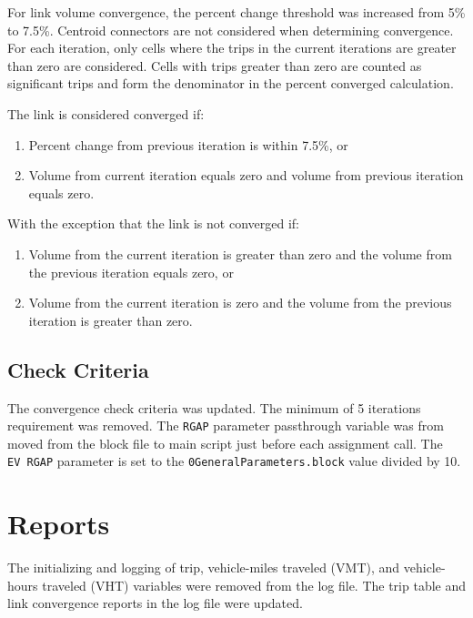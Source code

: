 \documentclass[
  letterpaper,
  DIV=11,
  numbers=noendperiod,
  titlepage=false]{scrreprt}
\providecommand{\tightlist}{%
  \setlength{\itemsep}{0pt}\setlength{\parskip}{0pt}}\usepackage{longtable,booktabs,array}
\begin{document}
For link volume convergence, the percent change threshold was increased
from 5\% to 7.5\%. Centroid connectors are not considered when
determining convergence. For each iteration, only cells where the trips
in the current iterations are greater than zero are considered. Cells
with trips greater than zero are counted as significant trips and form
the denominator in the percent converged calculation.

The link is considered converged if:

\begin{enumerate}
\def\labelenumi{\arabic{enumi}.}
\tightlist
\item
  Percent change from previous iteration is within 7.5\%, or
\item
  Volume from current iteration equals zero and volume from previous
  iteration equals zero.
\end{enumerate}

With the exception that the link is not converged if:

\begin{enumerate}
\def\labelenumi{\arabic{enumi}.}
\tightlist
\item
  Volume from the current iteration is greater than zero and the volume
  from the previous iteration equals zero, or
\item
  Volume from the current iteration is zero and the volume from the
  previous iteration is greater than zero.
\end{enumerate}

\hypertarget{check-criteria}{%
\subsection{Check Criteria}\label{check-criteria}}

The convergence check criteria was updated. The minimum of 5 iterations
requirement was removed. The \texttt{RGAP} parameter passthrough
variable was from moved from the block file to main script just before
each assignment call. The \texttt{EV\ RGAP} parameter is set to the
\texttt{0GeneralParameters.block} value divided by 10.

\hypertarget{reports}{%
\section{Reports}\label{reports}}

The initializing and logging of trip, vehicle-miles traveled (VMT), and
vehicle-hours traveled (VHT) variables were removed from the log file.
The trip table and link convergence reports in the log file were
updated.
\end{document}
